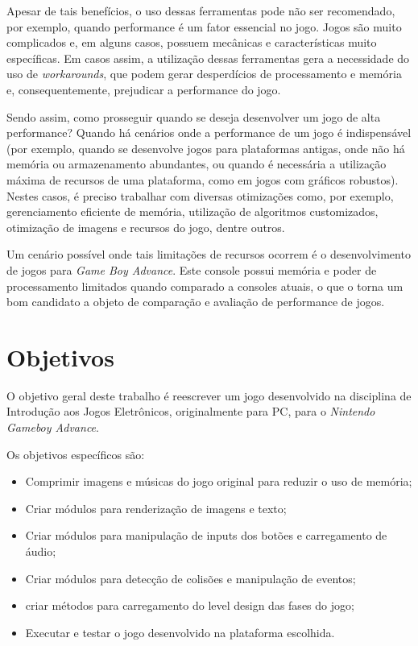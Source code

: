 Apesar de tais benefícios, o uso dessas ferramentas pode não ser recomendado, por exemplo, quando performance é um fator essencial no jogo. Jogos são muito complicados e, em alguns casos, possuem mecânicas e características muito específicas. Em casos assim, a utilização dessas ferramentas gera a necessidade do uso de \textit{workarounds}, que podem gerar desperdícios de processamento e memória e, consequentemente, prejudicar a performance do jogo.

Sendo assim, como prosseguir quando se deseja desenvolver um jogo de alta performance? Quando há cenários onde a performance de um jogo é indispensável (por exemplo, quando se desenvolve jogos para plataformas antigas, onde não há memória ou armazenamento abundantes, ou quando é necessária a utilização máxima de recursos de uma plataforma, como em jogos com gráficos robustos). Nestes casos, é preciso trabalhar com diversas otimizações como, por exemplo, gerenciamento eficiente de memória, utilização de algoritmos customizados, otimização de imagens e recursos do jogo, dentre outros.

Um cenário possível onde tais limitações de recursos ocorrem é o desenvolvimento de jogos para \textit{Game Boy Advance}. Este console possui memória e poder de processamento limitados quando comparado a consoles atuais, o que o torna um bom candidato a objeto de comparação e avaliação de performance de jogos.

\section*{Objetivos}

O objetivo geral deste trabalho é reescrever um jogo desenvolvido na disciplina de Introdução aos Jogos Eletrônicos, originalmente para PC, para o \textit{Nintendo Gameboy Advance}.

Os objetivos específicos são:

\begin{itemize}
\item Comprimir imagens e músicas do jogo original para reduzir o uso de memória;
\item Criar módulos para renderização de imagens e texto;
\item Criar módulos para manipulação de inputs dos botões e carregamento de áudio;
\item Criar módulos para detecção de colisões e manipulação de eventos;
\item criar métodos para carregamento do level design das fases do jogo;
\item Executar e testar o jogo desenvolvido na plataforma escolhida.
\end{itemize}

